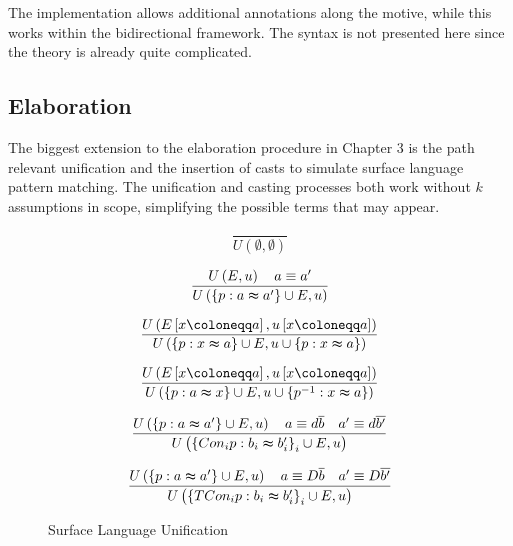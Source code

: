 The implementation allows additional annotations along the motive,
while this works within the bidirectional framework. The syntax is
not presented here since the theory is already quite complicated.

\subsection{Elaboration}

The biggest extension to the elaboration procedure in Chapter 3 is
the path relevant unification and the insertion of casts to simulate
surface language pattern matching. The unification and casting processes
both work without $k$ assumptions in scope, simplifying the possible
terms that may appear.


\begin{figure}
\[
\frac{\,}{U\left(\emptyset,\emptyset\right)}
\]

\[
\frac{U\left(E,u\right)\quad a\equiv a'}{U\left(\left\{ p:a\thickapprox a'\right\} \cup E,u\right)}
\]

\[
\frac{U\left(E\left[x\coloneqq a\right],u\left[x\coloneqq a\right]\right)}{U\left(\left\{ p:x\thickapprox a\right\} \cup E,u\cup\left\{ p:x\thickapprox a\right\} \right)}
\]


\[
\frac{U\left(E\left[x\coloneqq a\right],u\left[x\coloneqq a\right]\right)}{U\left(\left\{ p:a\thickapprox x\right\} \cup E,u\cup\left\{ p^{-1}:x\thickapprox a\right\} \right)}
\]

\[
\frac{U\left(\left\{ p:a\thickapprox a'\right\} \cup E,u\right)\quad a\equiv d\overline{b}\quad a'\equiv d\overline{b'}}{U\left(\left\{ Con_{i}p:b_{i}\thickapprox b'_{i}\right\} _{i}\cup E,u\right)}
\]


\[
\frac{U\left(\left\{ p:a\thickapprox a'\right\} \cup E,u\right)\quad a\equiv D\overline{b}\quad a'\equiv D\overline{b'}}{U\left(\left\{ TCon_{i}p:b_{i}\thickapprox b'_{i}\right\} _{i}\cup E,u\right)}
\]






\caption{Surface Language Unification}
\label{fig:surface-data-unification}
\end{figure}


